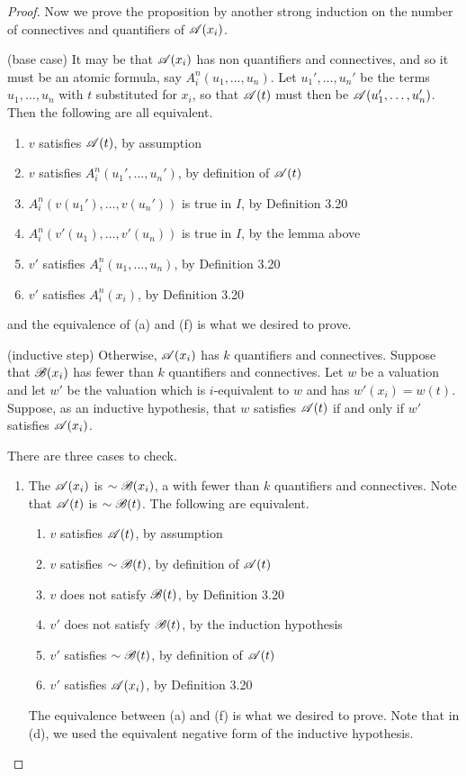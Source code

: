 \begin{proposition}
\begin{proof}
    Now we prove the proposition by another strong induction on the number of connectives and quantifiers of \(\mathscr{A}(x_i)\).

    (base case) It may be that \(\mathscr{A}(x_i)\) has non quantifiers and connectives, and so it must be an atomic formula, say \(A^n_i(u_1, \dots, u_n)\). Let \(u_1', \dots, u_n'\) be the terms \(u_1, \dots, u_n\) with \(t\) substituted for \(x_i\), so that \(\mathscr{A}(t)\) must then be \(\mathscr{A}(u_1', \dots, u_n')\). Then the following are all equivalent.
    \begin{enumerate}[label=(\alph*), align=left]
      \item \(v\) satisfies \(\mathscr{A}(t)\), by assumption
      \item \(v\) satisfies \(A^n_i(u_1', \dots, u_n')\), by definition of \(\mathscr{A}(t)\)
      \item \(A^n_i(v(u_1'), \dots, v(u_n'))\) is true in \(I\), by Definition 3.20
      \item \(A^n_i(v'(u_1), \dots, v'(u_n))\) is true in \(I\), by the lemma above
      \item \(v'\) satisfies \(A^n_i(u_1, \dots, u_n)\), by Definition 3.20
      \item \(v'\) satisfies \(A^n_i(x_i)\), by Definition 3.20
    \end{enumerate}
    and the equivalence of (a) and (f) is what we desired to prove.

    (inductive step) Otherwise, \(\mathscr{A}(x_i)\) has \(k\) quantifiers and connectives. Suppose that \(\mathscr{B}(x_i)\) has fewer than \(k\) quantifiers and connectives. Let \(w\) be a valuation and let \(w'\) be the valuation which is \(i\)-equivalent to \(w\) and has \(w'(x_i) = w(t)\). Suppose, as an inductive hypothesis, that \(w\) satisfies \(\mathscr{A}(t)\) if and only if \(w'\) satisfies \(\mathscr{A}(x_i)\).

    There are three cases to check.
      \begin{enumerate}
        \item The \wf{} \(\mathscr{A}(x_i)\) is \(\sim\mathscr{B}(x_i)\), a \wf{} with fewer than \(k\) quantifiers and connectives. Note that \(\mathscr{A}(t)\) is \(\sim\mathscr{B}(t)\). The following are equivalent.
          \begin{enumerate}
            \item \(v\) satisfies \(\mathscr{A}(t)\), by assumption
            \item \(v\) satisfies \(\sim\mathscr{B}(t)\), by definition of \(\mathscr{A}(t)\)
            \item \(v\) does not satisfy \(\mathscr{B}(t)\), by Definition 3.20
            \item \(v'\) does not satisfy \(\mathscr{B}(t)\), by the induction hypothesis
            \item \(v'\) satisfies \(\sim\mathscr{B}(t)\), by definition of \(\mathscr{A}(t)\)
            \item \(v'\) satisfies \(\mathscr{A}(x_i)\), by Definition 3.20
          \end{enumerate}
          The equivalence between (a) and (f) is what we desired to prove. Note that in (d), we used the equivalent negative form of the inductive hypothesis.


\end{enumerate}
\end{proof}
\end{proposition}
